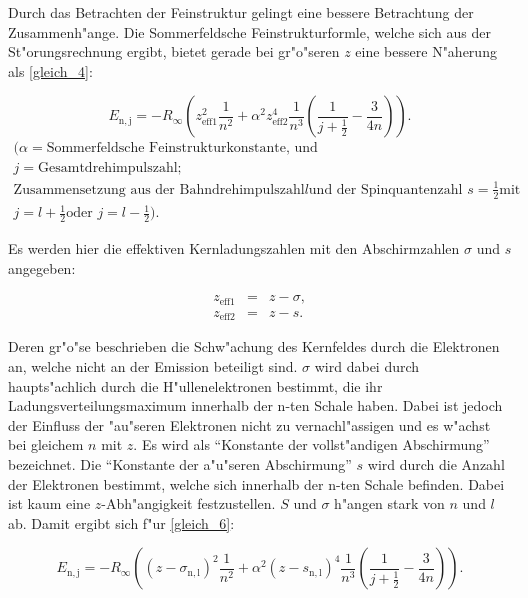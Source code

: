 		Durch das Betrachten der Feinstruktur gelingt eine bessere Betrachtung der Zu\-sam\-men\-h"an\-ge.
		Die Sommerfeldsche Feinstrukturformle, welche sich aus der St"orungsrechnung ergibt, bietet gerade bei gr"o"seren $z$ eine bessere N"aherung als \eqref{gleich_4}:

		\begin{equation}
			E_\mathrm{n,j} = -R_\infty \left(z_\mathrm{eff1}^2 \frac{1}{n^2} + \alpha^2 z_\mathrm{eff2}^4 \frac{1}{n^3} \left( \frac{1}{j + \frac{1}{2}} - \frac{3}{4n} \right) \right).\label{gleich_6}
		\end{equation}
		\begin{eqnarray*}
			(\alpha = \text{Sommerfeldsche Feinstrukturkonstante, und } \\
			j = \text{Gesamtdrehimpulszahl;} \\
			\text{Zusammensetzung aus der Bahndrehimpulszahl} l \text{und der Spinquantenzahl } s = \frac{1}{2} \text{mit}\\
			j = l + \frac{1}{2} \text{oder } j = l - \frac{1}{2}).
		\end{eqnarray*}

		Es werden hier die effektiven Kernladungszahlen mit den Abschirmzahlen $\sigma$ und $s$ angegeben:

		\begin{eqnarray*}
			z_\mathrm{eff1} &=& z - \sigma,\\
			z_\mathrm{eff2} &=& z - s.
		\end{eqnarray*}

		Deren gr"o"se beschrieben die Schw"achung des Kernfeldes durch die Elektronen an, welche nicht an der Emission beteiligt sind.
		$\sigma$ wird dabei durch haupts"achlich durch die H"ul\-len\-e\-lek\-tro\-nen bestimmt, die ihr Ladungsverteilungsmaximum innerhalb der n-ten Schale haben.
		Dabei ist jedoch der Einfluss der "au"seren Elektronen nicht zu vernachl"assigen und es w"achst bei gleichem $n$ mit $z$.
		Es wird als "`Konstante der vollst"andigen Abschirmung"' bezeichnet.
		Die "`Konstante der a"u"seren Abschirmung"' $s$ wird durch die Anzahl der Elektronen bestimmt, welche sich innerhalb der n-ten Schale befinden.
		Dabei ist kaum eine $z$-Ab\-h"an\-gig\-keit festzustellen.
		$S$ und $\sigma$ h"angen stark von $n$ und $l$ ab.
		Damit ergibt sich f"ur \eqref{gleich_6}:

		\begin{equation}
			E_\mathrm{n,j} = -R_\infty \left( (z - \sigma_\mathrm{n,l})^2 \frac{1}{n^2} + \alpha^2 (z - s_\mathrm{n,l})^4 \frac{1}{n^3} \left( \frac{1}{j + \frac{1}{2}} - \frac{3}{4n} \right) \right). \label{gleich_7}
		\end{equation}

